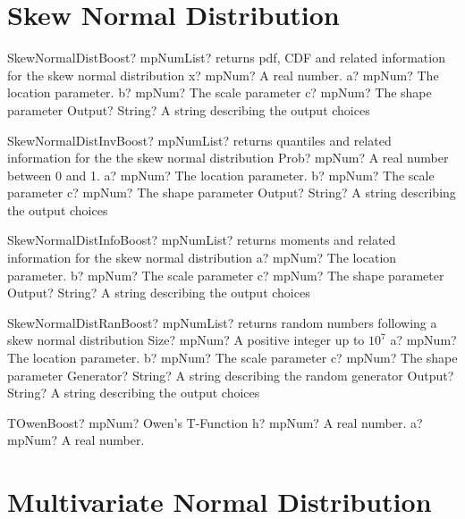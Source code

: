 \documentclass[12pt,a4paper,openany]{book}
\begin{document}
\section{Skew Normal Distribution}

\begin{mpFunctionsExtract}
\mpFunctionFiveNotImplemented
{SkewNormalDistBoost? mpNumList? returns pdf, CDF and related information for the skew normal distribution}
{x? mpNum? A real number.}
{a? mpNum? The location parameter.}
{b? mpNum? The scale parameter}
{c? mpNum? The shape parameter}
{Output? String? A string describing the output choices}
\end{mpFunctionsExtract}

\begin{mpFunctionsExtract}
\mpFunctionFiveNotImplemented
{SkewNormalDistInvBoost? mpNumList? returns quantiles and related information for the the skew normal distribution}
{Prob? mpNum? A real number between 0 and 1.}
{a? mpNum? The location parameter.}
{b? mpNum? The scale parameter}
{c? mpNum? The shape parameter}
{Output? String? A string describing the output choices}
\end{mpFunctionsExtract}

\begin{mpFunctionsExtract}
\mpFunctionFourNotImplemented
{SkewNormalDistInfoBoost? mpNumList? returns moments and related information for the skew normal distribution}
{a? mpNum? The location parameter.}
{b? mpNum? The scale parameter}
{c? mpNum? The shape parameter}
{Output? String? A string describing the output choices}
\end{mpFunctionsExtract}

\begin{mpFunctionsExtract}
\mpFunctionSixNotImplemented
{SkewNormalDistRanBoost? mpNumList? returns random numbers following a skew normal distribution}
{Size? mpNum? A positive integer up to $10^7$}
{a? mpNum? The location parameter.}
{b? mpNum? The scale parameter}
{c? mpNum? The shape parameter}
{Generator? String? A string describing the random generator}
{Output? String? A string describing the output choices}
\end{mpFunctionsExtract}

\begin{mpFunctionsExtract}
\mpFunctionTwo
{TOwenBoost? mpNum? Owen's T-Function}
{h? mpNum? A real number.}
{a? mpNum? A real number.}
\end{mpFunctionsExtract}

\section{Multivariate Normal Distribution}
\end{document}
